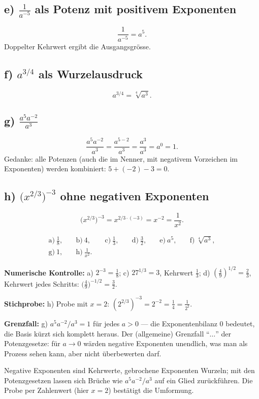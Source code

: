 \subsection*{e) $\frac1{a^{-5}}$ als Potenz mit positivem Exponenten}
\begin{equation}
  \frac1{a^{-5}}=a^5 .
\end{equation}
Doppelter Kehrwert ergibt die Ausgangsgrösse.

\subsection*{f) $a^{3/4}$ als Wurzelausdruck}
\begin{equation}
  a^{3/4}=\sqrt[4]{a^3} .
\end{equation}

\subsection*{g) $\frac{a^5 a^{-2}}{a^3}$}
\begin{equation}
  \frac{a^5 a^{-2}}{a^3}=\frac{a^{5-2}}{a^3}=\frac{a^3}{a^3}=a^0=1 .
\end{equation}
Gedanke: alle Potenzen (auch die im Nenner, mit negativem Vorzeichen im
Exponenten) werden kombiniert: $5+(-2)-3=0$.

\subsection*{h) $\bigl(x^{2/3}\bigr)^{-3}$ ohne negativen Exponenten}
\begin{equation}
  \bigl(x^{2/3}\bigr)^{-3}=x^{2/3\cdot(-3)}=x^{-2}=\frac1{x^2} .
\end{equation}

\begin{ergebnis}
\begin{align*}
  \text{a)}\ \tfrac18, &\quad
  \text{b)}\ 4, &\quad
  \text{c)}\ \tfrac13, &\quad
  \text{d)}\ \tfrac32, &\quad
  \text{e)}\ a^5, &\quad
  \text{f)}\ \sqrt[4]{a^3},\\
  \text{g)}\ 1, &\quad
  \text{h)}\ \tfrac1{x^2}.
\end{align*}
\end{ergebnis}

\begin{kontrolle}
\textbf{Numerische Kontrolle:} a) $2^{-3}=\tfrac1{8}$; c) $27^{1/3}=3$,
Kehrwert $\tfrac13$; d) $(\tfrac49)^{1/2}=\tfrac23$, Kehrwert jedes
Schritts: $\bigl(\tfrac49\bigr)^{-1/2}=\tfrac32$. \checkmark

\textbf{Stichprobe:} h) Probe mit $x=2$:
$(2^{2/3})^{-3}=2^{-2}=\tfrac14=\tfrac1{2^2}$. \checkmark

\textbf{Grenzfall:} g) $a^5 a^{-2}/a^3=1$ für jedes $a>0$ --- die
Exponentenbilanz $0$ bedeutet, die Basis kürzt sich komplett heraus. Der
(allgemeine) Grenzfall ``$\ldots$'' der Potenzgesetze: für $a\to0$
w\"arden negative Exponenten unendlich, was man als Prozess sehen kann,
aber nicht \"uberbewerten darf.
\end{kontrolle}

\begin{merksatz}
Negative Exponenten sind Kehrwerte, gebrochene Exponenten Wurzeln; mit
den Potenzgesetzen lassen sich Brüche wie $a^5a^{-2}/a^3$ auf ein Glied
zurückführen. Die Probe per Zahlenwert (hier $x=2$) bestätigt die
Umformung.
\end{merksatz}
